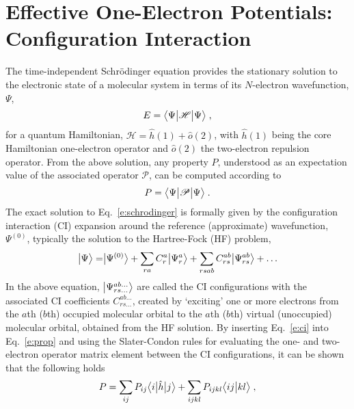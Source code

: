 \section{\label{s:3}Effective One-Electron Potentials: Configuration Interaction}

The time\hyp{}independent Schr{\"o}dinger equation provides the stationary solution to the
electronic state
of a molecular system in terms of its $N$\hyp{}electron wavefunction, $\Psi$,
%
\begin{equation} \label{e:schrodinger}
 E = \tBraKet{\Psi}{\mathscr{H}}{\Psi} \;,
\end{equation}
%
for a quantum Hamiltonian, $\mathscr{H} = \hat{h}(1) + \hat{o}(2)$,
with $\hat{h}(1)$ being the core Hamiltonian one\hyp{}electron operator
and $\hat{o}(2)$ the two\hyp{}electron repulsion operator.
From the above solution, any property $P$, understood as an expectation value of the
associated operator $\mathscr{P}$, can be computed according to
%
\begin{equation} \label{e:prop}
 P = \tBraKet{\Psi}{\mathscr{P}}{\Psi} \;.
\end{equation}
%
The exact solution to Eq.~\eqref{e:schrodinger} is formally given by
the configuration interaction (CI) expansion around the reference 
(approximate) wavefunction, $\Psi^{(0)}$,
typically the solution to the Hartree\hyp{}Fock (HF) problem\cite{Roothaan.RevModPhys.1951},
%
\begin{equation} \label{e:ci}
 \Ket{\Psi} = \Ket{\Psi^{(0)}} + \sum_{ra} C_{r}^{a} \Ket{\Psi_{r}^{a}} + 
	 \sum_{rsab} C_{rs}^{ab} \Ket{\Psi_{rs}^{ab}} + \ldots
\end{equation}
%
In the above equation,
$\Ket{\Psi_{rs\ldots}^{ab\ldots}}$ are called the CI configurations
with the associated CI coefficients $C_{rs\ldots}^{ab\ldots}$, created by `exciting'
one or more electrons from the $a$th ($b$th) occupied molecular orbital to the $a$th ($b$th)
virtual (unoccupied) molecular orbital, obtained from the HF solution.
By inserting Eq.~\eqref{e:ci} into Eq.~\eqref{e:prop} 
and using the Slater\hyp{}Condon rules for evaluating the one\hyp{} and two\hyp{}electron
operator matrix element between
the CI configurations, it can be shown that the following holds
%
\begin{equation} \label{e:exp-val-series}
	P =
	\sum_{ij} P_{ij} \tBraKet{i}{\hat{h}}{j}
	+ \sum_{ijkl} P_{ijkl} \BraKet{ij}{kl}  \;,
\end{equation}
%

